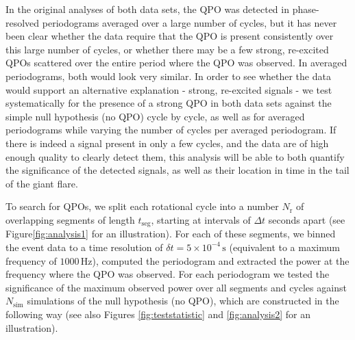 \documentclass{emulateapj}
\begin{document}
In the original analyses of both data sets, the QPO was detected in phase-resolved periodograms averaged over a large number of cycles, but it has never been clear whether the data require that the QPO is present consistently over this large number of cycles, or whether there may be a few strong, re-excited QPOs scattered over the entire period where the QPO was observed. In averaged periodograms, both would look very similar.
In order to see whether the data would support an alternative explanation - strong, re-excited signals - we test systematically for the presence of a strong QPO in both data sets against the simple null hypothesis (no QPO) cycle by cycle, as well as for averaged periodograms while varying the number of cycles per averaged periodogram. If there is indeed a signal present in only a few cycles, and the data are of high enough quality to clearly detect them, this analysis will be able to both quantify the significance of the detected signals, as well as their location in time in the tail of the giant flare.



To search for QPOs, we split each rotational cycle into a number $N_\mathrm{r}$ of overlapping segments of length $t_{\mathrm{seg}}$, starting at intervals of $\Delta t$ seconds apart (see Figure\ref{fig:analysis1} for an illustration). For each of these segments, we binned the event data to a time resolution of $\delta t = 5 \times10^{-4} \, \mathrm{s}$ (equivalent to a maximum frequency of $1000 \, \mathrm{Hz}$), computed the periodogram and extracted the power at the frequency where the QPO was observed. For each periodogram we tested the significance of the maximum observed power over all segments and cycles against $N_{\mathrm{sim}}$ simulations of the null hypothesis (no QPO), which are constructed in the following way (see also Figures \ref{fig:teststatistic} and \ref{fig:analysis2} for an illustration).
\end{document}
